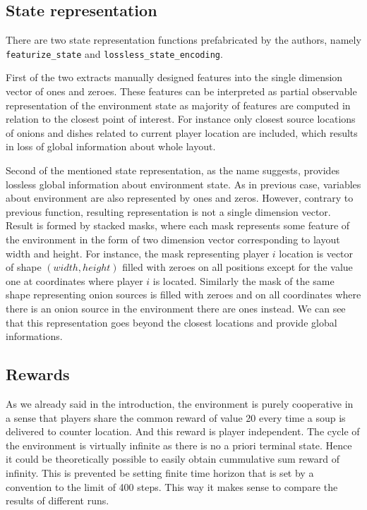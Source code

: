 \subsection{State representation}\label{StateRepresentation}
There are two state representation functions prefabricated by the authors, namely \texttt{featurize\_state} and \texttt{lossless\_state\_encoding}.

First of the two extracts manually designed features into the single dimension vector of ones and zeroes. 
These features can be interpreted as partial observable representation of the environment state as majority of features are computed in relation to the closest point of interest.
For instance only closest source locations of onions and dishes related to current player location are included, which results in loss of global information about whole layout. 

Second of the mentioned state representation, as the name suggests, provides lossless global information about environment state.
As in previous case, variables about environment are also represented by ones and zeros. 
However, contrary to previous function, resulting representation is not a single dimension vector.
Result is formed by stacked masks, where each mask represents some feature of the environment in the form of two dimension vector corresponding to layout width and height.
For instance, the mask representing player $i$ location is vector of shape $(width, height)$ filled with zeroes on all positions except for the value one at coordinates where player $i$ is located.
Similarly the mask of the same shape representing onion sources is filled with zeroes and on all coordinates where there is an onion source in the environment there are ones instead.
We can see that this representation goes beyond the closest locations and provide global informations.

\subsection{Rewards}
As we already said in the introduction, the environment is purely cooperative in a sense that players share the common reward of value 20 every time a soup is delivered to counter location.
And this reward is player independent. 
The cycle of the environment is virtually infinite as there is no a priori terminal state. 
Hence it could be theoretically possible to easily obtain cummulative sum reward of infinity.
This is prevented be setting finite time horizon that is set by a convention to the limit of 400 steps.
This way it makes sense to compare the results of different runs.

